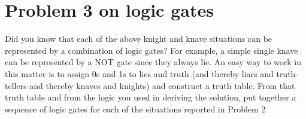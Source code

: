 \documentclass[11pt]{book}
\begin{document}
\newpage

\section{Problem 3 on logic gates}
Did you know that each of the above knight and knave situations can be represented by a combination of logic gates? For example, a simple single knave can be represented by a NOT gate since they always lie. An easy way to work in this matter is to assign 0s and 1s to lies and truth (and thereby liars and truth-tellers and thereby knaves and knights) and construct a truth table. From that truth table and from the logic you used in deriving the solution, put together a sequence of logic gates for each of the situations reported in Problem 2
\end{document}
